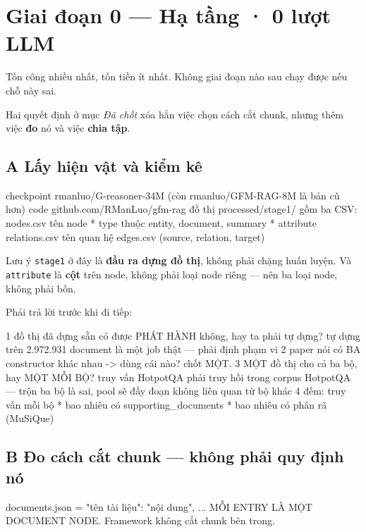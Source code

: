 \documentclass[11pt,a4paper]{article}
\begin{document}
\section{Giai đoạn 0 — Hạ tầng · 0 lượt LLM}

Tốn công nhiều nhất, tốn tiền ít nhất. Không giai đoạn nào sau chạy được nếu chỗ này sai.

Hai quyết định ở mục \emph{Đã chốt} xóa hẳn việc chọn cách cắt chunk, nhưng thêm việc \textbf{đo} nó và
việc \textbf{chia tập}.

\subsection{A Lấy hiện vật và kiểm kê}

\begin{dia}
checkpoint     rmanluo/G-reasoner-34M        (còn rmanluo/GFM-RAG-8M là bản cũ hơn)
code           github.com/RManLuo/gfm-rag
đồ thị         processed/stage1/  gồm ba CSV:
                   nodes.csv      tên node * type thuộc {entity, document, summary} * attribute
                   relations.csv  tên quan hệ
                   edges.csv      (source, relation, target)
\end{dia}

Lưu ý \texttt{stage1} ở đây là \textbf{đầu ra dựng đồ thị}, không phải chặng huấn luyện. Và \texttt{attribute} là
\textbf{cột} trên node, không phải loại node riêng — nên ba loại node, không phải bốn.

Phải trả lời trước khi đi tiếp:

\begin{dia}
1  đồ thị đã dựng sẵn có được PHÁT HÀNH không, hay ta phải tự dựng?
   tự dựng trên 2.972.931 document là một job thật — phải định phạm vi
2  paper nói có BA constructor khác nhau  ->  dùng cái nào?  chốt MỘT.
3  MỘT đồ thị cho cả ba bộ, hay MỘT MỖI BỘ?
   truy vấn HotpotQA phải truy hồi trong corpus HotpotQA —
   trộn ba bộ là sai, pool sẽ đầy đoạn không liên quan từ bộ khác
4  đếm:  truy vấn mỗi bộ * bao nhiêu có supporting_documents
         * bao nhiêu có phân rã (MuSiQue)
\end{dia}

\subsection{B Đo cách cắt chunk — không phải quy định nó}

\begin{dia}
documents.json = { "tên tài liệu": "nội dung", ... }
MỖI ENTRY LÀ MỘT DOCUMENT NODE.  Framework không cắt chunk bên trong.
\end{dia}
\end{document}
